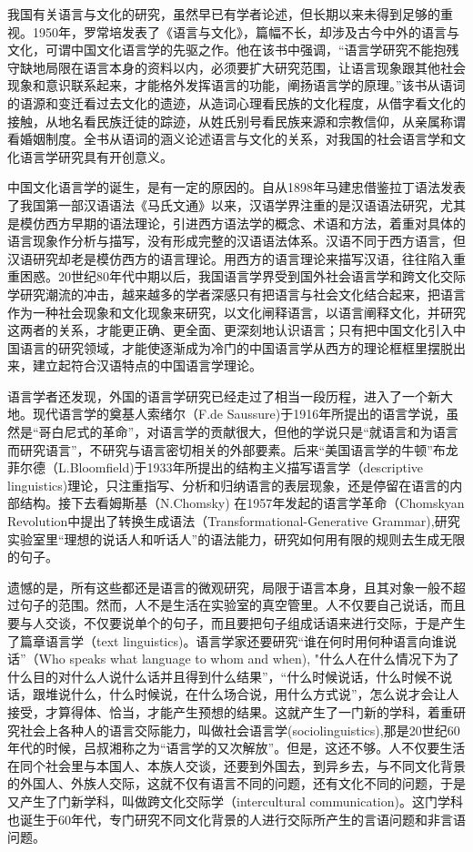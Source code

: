 我国有关语言与文化的研究，虽然早已有学者论述，但长期以来未得到足够的重视。1950年，罗常培发表了《语言与文化》，篇幅不长，却涉及古今中外的语言与文化，可谓中国文化语言学的先驱之作。他在该书中强调，“语言学研究不能抱残守缺地局限在语言本身的资料以内，必须要扩大研究范围，让语言现象跟其他社会现象和意识联系起来，才能格外发挥语言的功能，阐扬语言学的原理。”该书从语词的语源和变迁看过去文化的遗迹，从造词心理看民族的文化程度，从借字看文化的接触，从地名看民族迁徒的踪迹，从姓氏别号看民族来源和宗教信仰，从亲属称谓看婚姻制度。全书从语词的涵义论述语言与文化的关系，对我国的社会语言学和文化语言学研究具有开创意义。

中国文化语言学的诞生，是有一定的原因的。自从1898年马建忠借鉴拉丁语法发表了我国第一部汉语语法《马氏文通》以来，汉语学界注重的是汉语语法研究，尤其是模仿西方早期的语法理论，引进西方语法学的概念、术语和方法，着重对具体的语言现象作分析与描写，没有形成完整的汉语语法体系。汉语不同于西方语言，但汉语研究却老是模仿西方的语言理论。用西方的语言理论来描写汉语，往往陷入重重困惑。20世纪80年代中期以后，我国语言学界受到国外社会语言学和跨文化交际学研究潮流的冲击，越来越多的学者深感只有把语言与社会文化结合起来，把语言作为一种社会现象和文化现象来研究，以文化闸释语言，以语言阐释文化，并研究这两者的关系，才能更正确、更全面、更深刻地认识语言；只有把中国文化引入中国语言的研究领域，才能使逐渐成为冷门的中国语言学从西方的理论框框里摆脱出来，建立起符合汉语特点的中国语言学理论。

语言学者还发现，外国的语言学研究已经走过了相当一段历程，进入了一个新大地。现代语言学的奠基人索绪尔（F.de Saussure)于1916年所提出的语言学说，虽然是“哥白尼式的革命”，对语言学的贡献很大，但他的学说只是“就语言和为语言而研究语言”，不研究与语言密切相关的外部要素。后来“美国语言学的牛顿”布龙菲尔德（L.Bloomfield)于1933年所提出的结构主义描写语言学（descriptive linguistics)理论，只注重指写、分析和归纳语言的表层现象，还是停留在语言的内部结构。接下去看姆斯基（N.Chomsky) 在1957年发起的语言学革命（Chomskyan Revolution中提出了转换生成语法（Transformational-Generative Grammar),研究实验室里“理想的说话人和听话人”的语法能力，研究如何用有限的规则去生成无限的句子。

遗憾的是，所有这些都还是语言的微观研究，局限于语言本身，且其对象一般不超过句子的范围。然而，人不是生活在实验室的真空管里。人不仅要自己说话，而且要与人交谈，不仅要说单个的句子，而且要把句子组成话语来进行交际，于是产生了篇章语言学（text linguistics)。语言学家还要研究“谁在何时用何种语言向谁说话”（Who speaks what language to whom and when), "什么人在什么情况下为了什么目的对什么人说什么话并且得到什么结果”，“什么时候说话，什么时候不说话，跟堆说什么，什么时候说，在什么场合说，用什么方式说”，怎么说才会让人接受，才算得体、恰当，才能产生预想的结果。这就产生了一门新的学科，着重研究社会上各种人的语言交际能力，叫做社会语言学(sociolinguistics),那是20世纪60年代的时候，吕叔湘称之为“语言学的又次解放”。但是，这还不够。人不仅要生活在同个社会里与本国人、本族人交谈，还要到外国去，到异乡去，与不同文化背景的外国人、外族人交际，这就不仅有语言不同的问题，还有文化不同的问题，于是又产生了门新学科，叫做跨文化交际学（intercultural communication)。这门学科也诞生于60年代，专门研究不同文化背景的人进行交际所产生的言语问题和非言语问题。

